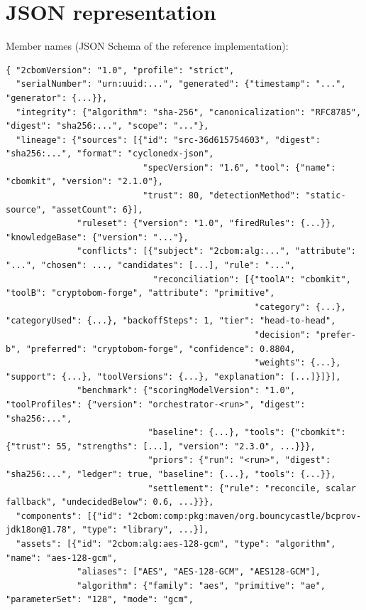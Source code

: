 \documentclass[11pt,a4paper]{article}
\theoremstyle{definition}
\theoremstyle{plain}
\begin{document}
\section{JSON representation}\label{app:json}
Member names (JSON Schema  of the reference implementation):
\begin{lstlisting}
{ "2cbomVersion": "1.0", "profile": "strict",
  "serialNumber": "urn:uuid:...", "generated": {"timestamp": "...", "generator": {...}},
  "integrity": {"algorithm": "sha-256", "canonicalization": "RFC8785", "digest": "sha256:...", "scope": "..."},
  "lineage": {"sources": [{"id": "src-36d615754603", "digest": "sha256:...", "format": "cyclonedx-json",
                           "specVersion": "1.6", "tool": {"name": "cbomkit", "version": "2.1.0"},
                           "trust": 80, "detectionMethod": "static-source", "assetCount": 6}],
              "ruleset": {"version": "1.0", "firedRules": {...}}, "knowledgeBase": {"version": "..."},
              "conflicts": [{"subject": "2cbom:alg:...", "attribute": "...", "chosen": ..., "candidates": [...], "rule": "...",
                             "reconciliation": [{"toolA": "cbomkit", "toolB": "cryptobom-forge", "attribute": "primitive",
                                                 "category": {...}, "categoryUsed": {...}, "backoffSteps": 1, "tier": "head-to-head",
                                                 "decision": "prefer-b", "preferred": "cryptobom-forge", "confidence": 0.8804,
                                                 "weights": {...}, "support": {...}, "toolVersions": {...}, "explanation": [...]}]}],
              "benchmark": {"scoringModelVersion": "1.0", "toolProfiles": {"version": "orchestrator-<run>", "digest": "sha256:...",
                            "baseline": {...}, "tools": {"cbomkit": {"trust": 55, "strengths": [...], "version": "2.3.0", ...}}},
                            "priors": {"run": "<run>", "digest": "sha256:...", "ledger": true, "baseline": {...}, "tools": {...}},
                            "settlement": {"rule": "reconcile, scalar fallback", "undecidedBelow": 0.6, ...}}},
  "components": [{"id": "2cbom:comp:pkg:maven/org.bouncycastle/bcprov-jdk18on@1.78", "type": "library", ...}],
  "assets": [{"id": "2cbom:alg:aes-128-gcm", "type": "algorithm", "name": "aes-128-gcm",
              "aliases": ["AES", "AES-128-GCM", "AES128-GCM"],
              "algorithm": {"family": "aes", "primitive": "ae", "parameterSet": "128", "mode": "gcm",

\end{lstlisting}
\end{document}
